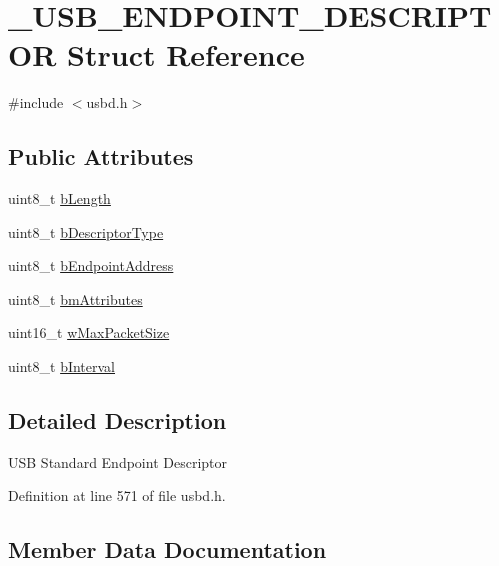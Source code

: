 \hypertarget{struct___u_s_b___e_n_d_p_o_i_n_t___d_e_s_c_r_i_p_t_o_r}{}\section{\+\_\+\+U\+S\+B\+\_\+\+E\+N\+D\+P\+O\+I\+N\+T\+\_\+\+D\+E\+S\+C\+R\+I\+P\+T\+OR Struct Reference}
\label{struct___u_s_b___e_n_d_p_o_i_n_t___d_e_s_c_r_i_p_t_o_r}


{\ttfamily \#include $<$usbd.\+h$>$}

\subsection*{Public Attributes}
\begin{DoxyCompactItemize}
\item 
uint8\+\_\+t \hyperlink{struct___u_s_b___e_n_d_p_o_i_n_t___d_e_s_c_r_i_p_t_o_r_aaea4723089a72e7d9b37077b9023c1a7}{b\+Length}
\item 
uint8\+\_\+t \hyperlink{struct___u_s_b___e_n_d_p_o_i_n_t___d_e_s_c_r_i_p_t_o_r_a3e5cc674ff534b668ec3521481ef4b37}{b\+Descriptor\+Type}
\item 
uint8\+\_\+t \hyperlink{struct___u_s_b___e_n_d_p_o_i_n_t___d_e_s_c_r_i_p_t_o_r_aefabc5abcdba38ecf2653b72f8f8c5ba}{b\+Endpoint\+Address}
\item 
uint8\+\_\+t \hyperlink{struct___u_s_b___e_n_d_p_o_i_n_t___d_e_s_c_r_i_p_t_o_r_a608be5427fa3b22e530f223933621c5e}{bm\+Attributes}
\item 
uint16\+\_\+t \hyperlink{struct___u_s_b___e_n_d_p_o_i_n_t___d_e_s_c_r_i_p_t_o_r_a534e9e14cebf01c6c7a0644ceed20502}{w\+Max\+Packet\+Size}
\item 
uint8\+\_\+t \hyperlink{struct___u_s_b___e_n_d_p_o_i_n_t___d_e_s_c_r_i_p_t_o_r_a63676a1177d7b52e63330a520628a8cd}{b\+Interval}
\end{DoxyCompactItemize}


\subsection{Detailed Description}
U\+SB Standard Endpoint Descriptor 

Definition at line 571 of file usbd.\+h.



\subsection{Member Data Documentation}
\mbox{\label{struct___u_s_b___e_n_d_p_o_i_n_t___d_e_s_c_r_i_p_t_o_r_a3e5cc674ff534b668ec3521481ef4b37}} 
